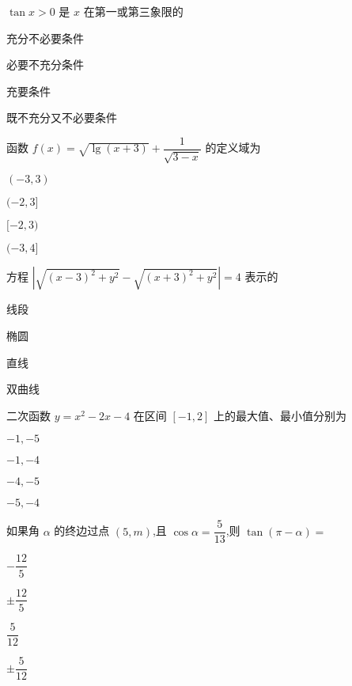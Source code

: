 \documentclass{exam-zh}
\begin{document}
\begin{question}
    $\tan x > 0$ 是 $x$ 在第一或第三象限的 \paren[C]
    \begin{choices}
        \item 充分不必要条件
        \item 必要不充分条件
        \item 充要条件
        \item 既不充分又不必要条件
    \end{choices}
\end{question}

\begin{question}
    函数 $f(x)=\sqrt{\lg(x + 3)}+\dfrac{1}{\sqrt{3 - x}}$ 的定义域为\paren[C]
    \begin{choices}
        \item $(-3,3)$
        \item $(-2,3]$
        \item $[-2,3)$
        \item $(-3,4]$
    \end{choices}
\end{question}

\begin{question}
    方程 $|\sqrt{(x - 3)^2 + y^2}-\sqrt{(x + 3)^2 + y^2}|=4$ 表示的\paren[D]
    \begin{choices}
        \item 线段
        \item 椭圆
        \item 直线
        \item 双曲线
    \end{choices}
\end{question}




\begin{question}
    二次函数 $y = x^2 - 2x - 4$ 在区间 $[-1,2]$ 上的最大值、最小值分别为\paren[A]
    \begin{choices}
        \item $-1, -5$
        \item $-1, -4$
        \item $-4, -5$
        \item $-5, -4$
    \end{choices}
    \end{question}
    
    \begin{question}
    如果角 $\alpha$ 的终边过点 $(5,m)$,且 $\cos\alpha=\dfrac{5}{13}$,则 $\tan(\pi - \alpha)=$\paren[A]
    \begin{choices}
        \item $-\dfrac{12}{5}$
        \item $\pm\dfrac{12}{5}$
        \item $\dfrac{5}{12}$
        \item $\pm\dfrac{5}{12}$
    \end{choices}
    \end{question}
    
\end{document}
